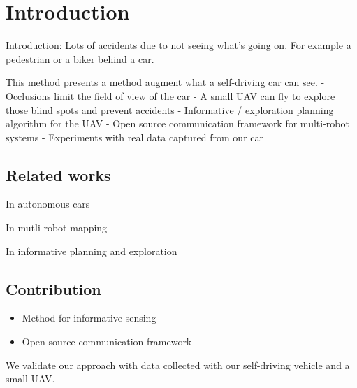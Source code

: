 
\section{Introduction}

Introduction: Lots of accidents due to not seeing what's going on. For example a pedestrian or a biker behind a car.

This method presents a method augment what a self-driving car can see.
- Occlusions limit the field of view of the car
- A small UAV can fly to explore those blind spots and prevent accidents
- Informative / exploration planning algorithm for the UAV
- Open source communication framework for multi-robot systems
- Experiments with real data captured from our car 

\subsection{Related works}

In autonomous cars

In mutli-robot mapping

In informative planning and exploration

\subsection{Contribution}

\begin{itemize}
\item
Method for informative sensing
\item
Open source communication framework
\end{itemize}

We validate our approach with data collected with our self-driving vehicle and a small UAV.
